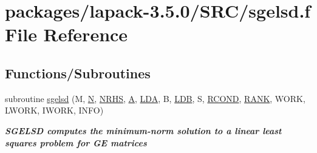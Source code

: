 \hypertarget{sgelsd_8f}{}\section{packages/lapack-\/3.5.0/\+S\+R\+C/sgelsd.f File Reference}
\label{sgelsd_8f}
\subsection*{Functions/\+Subroutines}
\begin{DoxyCompactItemize}
\item 
subroutine \hyperlink{group__realGEsolve_gabc655f9cb0f6cfff81b3cafc03c41dcb}{sgelsd} (M, \hyperlink{polmisc_8c_a0240ac851181b84ac374872dc5434ee4}{N}, \hyperlink{example__user_8c_aa0138da002ce2a90360df2f521eb3198}{N\+R\+H\+S}, \hyperlink{classA}{A}, \hyperlink{example__user_8c_ae946da542ce0db94dced19b2ecefd1aa}{L\+D\+A}, B, \hyperlink{example__user_8c_a50e90a7104df172b5a89a06c47fcca04}{L\+D\+B}, S, \hyperlink{superlu__enum__consts_8h_af00a42ecad444bbda75cde1b64bd7e72a9b5c151728d8512307565994c89919d5}{R\+C\+O\+N\+D}, \hyperlink{splinemodule_8c_a3a88bcc63386de30443dacede2e01847}{R\+A\+N\+K}, W\+O\+R\+K, L\+W\+O\+R\+K, I\+W\+O\+R\+K, I\+N\+F\+O)
\begin{DoxyCompactList}\small\item\em {\bfseries  S\+G\+E\+L\+S\+D computes the minimum-\/norm solution to a linear least squares problem for G\+E matrices} \end{DoxyCompactList}\end{DoxyCompactItemize}
